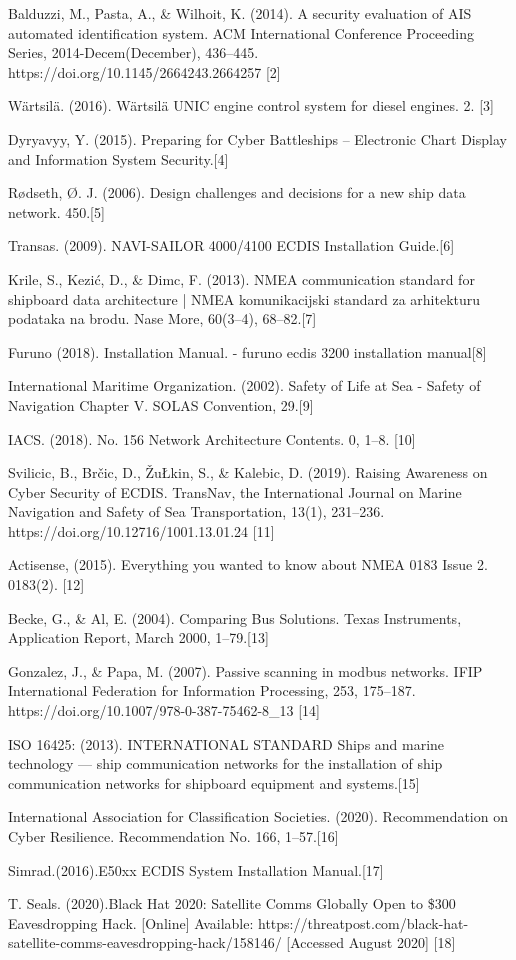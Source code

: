 \documentclass{report}
\begin{document}
Balduzzi, M., Pasta, A., \& Wilhoit, K. (2014). A security evaluation of AIS automated identification system. ACM International Conference Proceeding Series, 2014-Decem(December), 436–445. https://doi.org/10.1145/2664243.2664257 [2]

Wärtsilä. (2016). Wärtsilä UNIC engine control system for diesel engines. 2. [3]

Dyryavyy, Y. (2015). Preparing for Cyber Battleships – Electronic Chart Display and Information System Security.[4]

Rødseth, Ø. J. (2006). Design challenges and decisions for a new ship data network. 450.[5]

Transas. (2009). NAVI-SAILOR 4000/4100 ECDIS Installation Guide.[6]

Krile, S., Kezić, D., \& Dimc, F. (2013). NMEA communication standard for shipboard data architecture | NMEA komunikacijski standard za arhitekturu podataka na brodu. Nase More, 60(3–4), 68–82.[7]

Furuno (2018). Installation Manual. - furuno ecdis 3200 installation manual[8]

International Maritime Organization. (2002). Safety of Life at Sea - Safety of Navigation Chapter V. SOLAS Convention, 29.[9]

IACS. (2018). No. 156 Network Architecture Contents. 0, 1–8. [10]

Svilicic, B., Brčic, D., ŽuŁkin, S., \& Kalebic, D. (2019). Raising Awareness on Cyber Security of ECDIS. TransNav, the International Journal on Marine Navigation and Safety of Sea Transportation, 13(1), 231–236. https://doi.org/10.12716/1001.13.01.24 [11]

Actisense, (2015).  Everything you wanted to know about NMEA 0183 Issue 2. 0183(2). [12]

Becke, G., \& Al, E. (2004). Comparing Bus Solutions. Texas Instruments, Application Report, March 2000, 1–79.[13]

Gonzalez, J., \& Papa, M. (2007). Passive scanning in modbus networks. IFIP International Federation for Information Processing, 253, 175–187. https://doi.org/10.1007/978-0-387-75462-8\_13 [14]

ISO 16425: (2013). INTERNATIONAL STANDARD Ships and marine technology — ship communication networks for the installation of ship communication networks for shipboard equipment and systems.[15]

International Association for Classification Societies. (2020). Recommendation on Cyber Resilience. Recommendation No. 166, 1–57.[16]

Simrad.(2016).E50xx ECDIS System Installation Manual.[17]


T. Seals. (2020).Black Hat 2020: Satellite Comms Globally Open to \$300 Eavesdropping Hack. [Online] Available: https://threatpost.com/black-hat-satellite-comms-eavesdropping-hack/158146/ [Accessed August 2020] [18]
\end{document}
